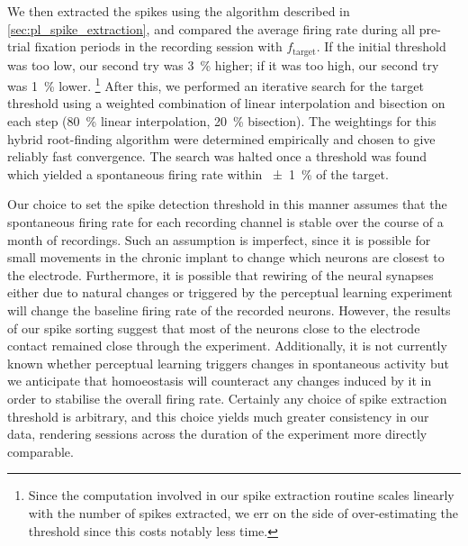 We then extracted the spikes using the algorithm described in \autoref{sec:pl_spike_extraction}, and compared the average firing rate during all pre-trial fixation periods in the recording session with $f_\text{target}$.
If the initial threshold was too low, our second try was \SI{3}{\percent} higher; if it was too high, our second try was \SI{1}{\percent} lower.%
\footnote{Since the computation involved in our spike extraction routine scales linearly with the number of spikes extracted, we err on the side of over-estimating the threshold since this costs notably less time.}
After this, we performed an iterative search for the target threshold using a weighted combination of linear interpolation and bisection on each step (\SI{80}{\percent} linear interpolation, \SI{20}{\percent} bisection).
The weightings for this hybrid root-finding algorithm were determined empirically and chosen to give reliably fast convergence.
The search was halted once a threshold was found which yielded a spontaneous firing rate within \SI{\pm1}{\percent} of the target.

Our choice to set the spike detection threshold in this manner assumes that the spontaneous firing rate for each recording channel is stable over the course of a month of recordings.
Such an assumption is imperfect, since it is possible for small movements in the chronic implant to change which neurons are closest to the electrode.
Furthermore, it is possible that rewiring of the neural synapses either due to natural changes or triggered by the perceptual learning experiment will change the baseline firing rate of the recorded neurons.
However, the results of our spike sorting suggest that most of the neurons close to the electrode contact remained close through the experiment.
Additionally, it is not currently known whether perceptual learning triggers changes in spontaneous activity but we anticipate that homoeostasis will counteract any changes induced by it in order to stabilise the overall firing rate.
Certainly any choice of spike extraction threshold is arbitrary, and this choice yields much greater consistency in our data, rendering sessions across the duration of the experiment more directly comparable.
